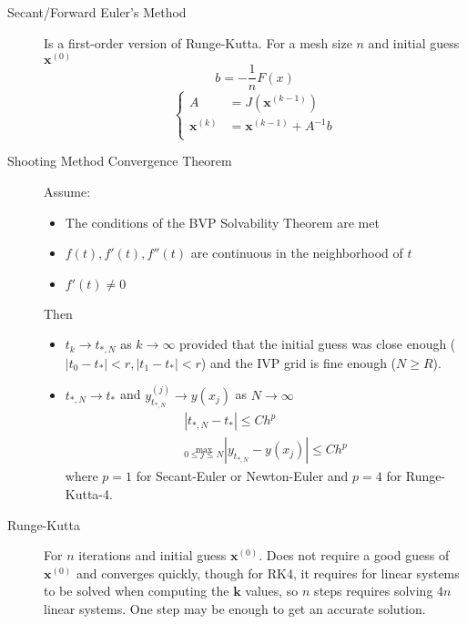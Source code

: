 \documentclass[8pt]{article}
\begin{document}
\begin{multicols}{2}
\begin{description}
  \item[Secant/Forward Euler's Method] Is a first-order version of Runge-Kutta. For a mesh size $n$ and
    initial guess $\mathbf{x}^{(0)}$
    \begin{equation*}
      b=-\frac{1}{n}F(x)
    \end{equation*}
    \begin{equation*}
      \left\{
        \begin{aligned}
          A &= J(\mathbf{x}^{(k-1)}) \\
          \mathbf{x}^{(k)} &= \mathbf{x}^{(k-1)}+ A^{-1}b \\
        \end{aligned}
      \right.
    \end{equation*}

  \item[Shooting Method Convergence Theorem]
    Assume:
    \begin{itemize}
    \item The conditions of the BVP Solvability Theorem are met
    \item $f(t), f'(t), f''(t)$ are continuous in the neighborhood of $t$
    \item $f'(t) \neq 0$
    \end{itemize}
    Then 
    \begin{itemize}
    \item $t_k \rightarrow t_{*,N}$ as $k\rightarrow\infty$ provided
      that the initial guess was close enough ($|t_0-t_*|<r,
      |t_1-t_*|<r$) and the IVP grid is fine enough ($N\geq R$).
    \item $t_{*,N} \rightarrow t_*$ and $y_{t_{*,N}}^{(j)} \rightarrow
      y(x_{j})$ as $N\rightarrow\infty$
        \begin{gather*}
          |t_{*,N}-t_*| \leq Ch^p \\
          \stackrel{\text{max}}{_{0\leq j\leq N}}  |y_{t_{*,N}}-y(x_j)| \leq Ch^p
        \end{gather*}
      where $p=1$ for Secant-Euler or Newton-Euler and $p=4$ for
      Runge-Kutta-4.
    \end{itemize}

  \item[Runge-Kutta] For $n$ iterations and initial guess $\mathbf{x}^{(0)}$. Does not require a
    good guess of $\mathbf{x}^{(0)}$ and converges quickly, though for RK4, it requires for linear
    systems to be solved when computing the $\mathbf{k}$ values, so $n$ steps requires solving
    $4n$ linear systems. One step may be enough to get an accurate solution.


\end{description}
\end{multicols}
\end{document}
